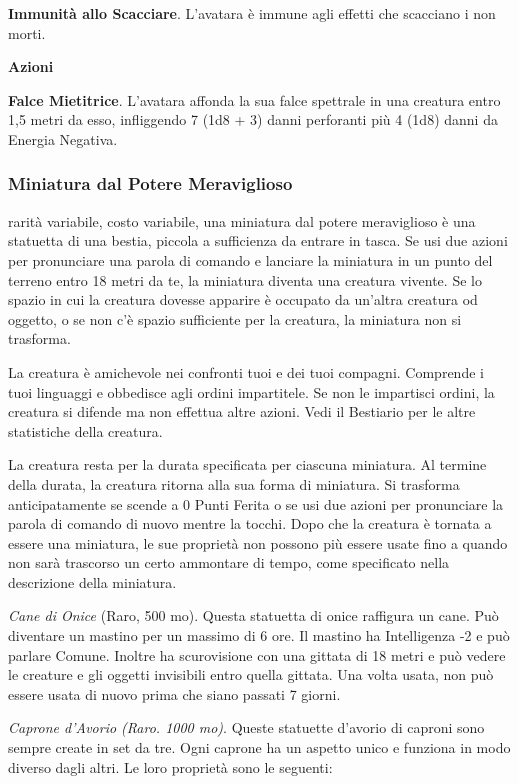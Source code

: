 \begin{multicols}{2}
\textbf{Immunità allo Scacciare}. L'avatara è immune agli effetti che scacciano i non morti.

\textbf{Azioni}

\textbf{Falce Mietitrice}. L'avatara affonda la sua falce spettrale in una creatura entro 1,5 metri da esso, infliggendo 7 (1d8 + 3) danni perforanti più 4 (1d8) danni da Energia Negativa.

\subsubsection*{Miniatura dal Potere Meraviglioso}
rarità variabile, costo variabile, una miniatura dal potere meraviglioso è una statuetta di una bestia, piccola a sufficienza da entrare in tasca. Se usi due azioni per pronunciare una parola di comando e lanciare la miniatura in un punto del terreno entro 18 metri da te, la miniatura diventa una creatura vivente. Se lo spazio in cui la creatura dovesse apparire è occupato da un'altra creatura od oggetto, o se non c'è spazio sufficiente per la creatura, la miniatura non si trasforma.

La creatura è amichevole nei confronti tuoi e dei tuoi compagni. Comprende i tuoi linguaggi e obbedisce agli ordini impartitele. Se non le impartisci ordini, la creatura si difende ma non effettua altre azioni. Vedi il Bestiario per le altre statistiche della creatura.

La creatura resta per la durata specificata per ciascuna miniatura. Al termine della durata, la creatura ritorna alla sua forma di miniatura. Si trasforma anticipatamente se scende a 0 Punti Ferita o se usi due azioni per pronunciare la parola di comando di nuovo mentre la tocchi. Dopo che la creatura è tornata a essere una miniatura, le sue proprietà non possono più essere usate fino a quando non sarà trascorso un certo ammontare di tempo, come specificato nella descrizione della miniatura.

\textit{Cane di Onice} (Raro, 500 mo). Questa statuetta di onice raffigura un cane. Può diventare un mastino per un massimo di 6 ore. Il mastino ha Intelligenza -2 e può parlare Comune. Inoltre ha scurovisione con una gittata di 18 metri e può vedere le creature e gli oggetti invisibili entro quella gittata. Una volta usata, non può essere usata di nuovo prima che siano passati 7 giorni.

\textit{Caprone d'Avorio (Raro. 1000 mo)}. Queste statuette d'avorio di caproni sono sempre create in set da tre. Ogni caprone ha un aspetto unico e funziona in modo diverso dagli altri. Le loro proprietà sono le seguenti:


\end{multicols}
